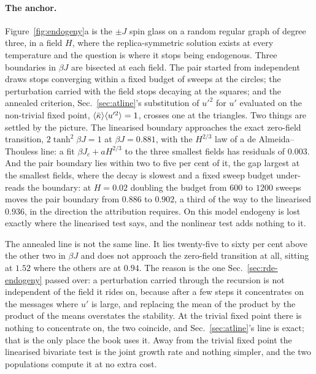 \paragraph{The anchor.} Figure~\ref{fig:endogeny}a is the $\pm J$ spin
glass on a random regular graph of degree three, in a field $H$, where the
replica-symmetric solution exists at every temperature and the question is
where it stops being endogenous. Three boundaries in $\beta J$ are bisected
at each field. The pair started from independent draws stops converging
within a fixed budget of sweeps at the circles; the perturbation carried
with the field stops decaying at the squares; and the annealed criterion,
Sec.~\ref{sec:atline}'s substitution of $u'^{2}$ for $u'$ evaluated on the
non-trivial fixed point, $\langle \bar\kappa \rangle\langle u'^{2} \rangle=1$, crosses one at the
triangles. Two things are settled by the picture. The linearised boundary
approaches the exact zero-field transition, $2\tanh^{2}\beta J=1$ at
$\beta J=0.881$, with the $H^{2/3}$ law of a de Almeida--Thouless line: a
fit $\beta J_{c}+aH^{2/3}$ to the three smallest fields has residuals of
$0.003$. And the pair boundary lies within two to five per cent of it, the
gap largest at the smallest fields, where the decay is slowest and a fixed
sweep budget under-reads the boundary: at $H=0.02$ doubling the budget
from $600$ to $1200$ sweeps moves the pair boundary from $0.886$ to
$0.902$, a third of the way to the linearised $0.936$, in the direction
the attribution requires. On this model endogeny is lost
exactly where the linearised test says, and the nonlinear test adds
nothing to it.

The annealed line is not the same line. It lies twenty-five to sixty per
cent above the other two in $\beta J$ and does not approach the zero-field
transition at all, sitting at $1.52$ where the others are at $0.94$. The
reason is the one Sec.~\ref{sec:rde-endogeny} passed over: a perturbation
carried through the recursion is not independent of the field it rides on,
because after a few steps it concentrates on the messages where $u'$ is
large, and replacing the mean of the product by the product of the means
overstates the stability. At the trivial fixed point there is nothing to
concentrate on, the two coincide, and Sec.~\ref{sec:atline}'s line is
exact; that is the only place the book uses it. Away from the trivial fixed
point the linearised bivariate test is the joint growth rate and nothing
simpler, and the two populations compute it at no extra cost.

